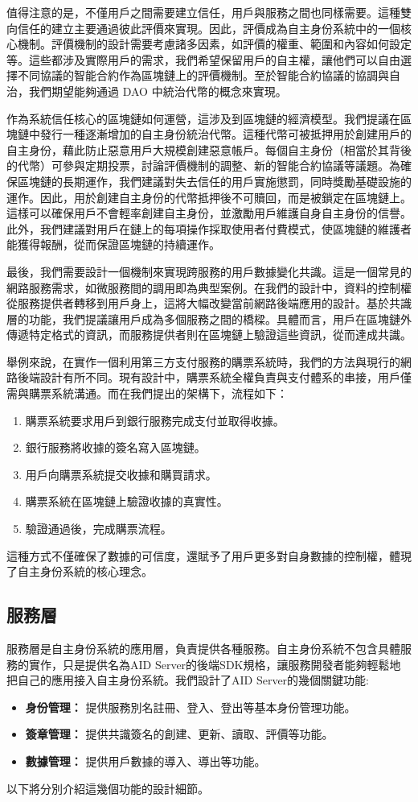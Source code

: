 值得注意的是，不僅用戶之間需要建立信任，用戶與服務之間也同樣需要。這種雙向信任的建立主要通過彼此評價來實現。因此，評價成為自主身份系統中的一個核心機制。評價機制的設計需要考慮諸多因素，如評價的權重、範圍和內容如何設定等。這些都涉及實際用戶的需求，我們希望保留用戶的自主權，讓他們可以自由選擇不同協議的智能合約作為區塊鏈上的評價機制。至於智能合約協議的協調與自治，我們期望能夠通過 DAO 中統治代幣的概念來實現。

作為系統信任核心的區塊鏈如何運營，這涉及到區塊鏈的經濟模型。我們提議在區塊鏈中發行一種逐漸增加的自主身份統治代幣。這種代幣可被抵押用於創建用戶的自主身份，藉此防止惡意用戶大規模創建惡意帳戶。每個自主身份（相當於其背後的代幣）可參與定期投票，討論評價機制的調整、新的智能合約協議等議題。為確保區塊鏈的長期運作，我們建議對失去信任的用戶實施懲罰，同時獎勵基礎設施的運作。因此，用於創建自主身份的代幣抵押後不可贖回，而是被鎖定在區塊鏈上。這樣可以確保用戶不會輕率創建自主身份，並激勵用戶維護自身自主身份的信譽。此外，我們建議對用戶在鏈上的每項操作採取使用者付費模式，使區塊鏈的維護者能獲得報酬，從而保證區塊鏈的持續運作。

最後，我們需要設計一個機制來實現跨服務的用戶數據變化共識。這是一個常見的網路服務需求，如微服務間的調用即為典型案例。在我們的設計中，資料的控制權從服務提供者轉移到用戶身上，這將大幅改變當前網路後端應用的設計。基於共識層的功能，我們提議讓用戶成為多個服務之間的橋樑。具體而言，用戶在區塊鏈外傳遞特定格式的資訊，而服務提供者則在區塊鏈上驗證這些資訊，從而達成共識。

舉例來說，在實作一個利用第三方支付服務的購票系統時，我們的方法與現行的網路後端設計有所不同。現有設計中，購票系統全權負責與支付體系的串接，用戶僅需與購票系統溝通。而在我們提出的架構下，流程如下：
\begin{enumerate}
  \item 購票系統要求用戶到銀行服務完成支付並取得收據。
  \item 銀行服務將收據的簽名寫入區塊鏈。
  \item 用戶向購票系統提交收據和購買請求。
  \item 購票系統在區塊鏈上驗證收據的真實性。
  \item 驗證通過後，完成購票流程。
\end{enumerate}
這種方式不僅確保了數據的可信度，還賦予了用戶更多對自身數據的控制權，體現了自主身份系統的核心理念。
\subsection{服務層}
服務層是自主身份系統的應用層，負責提供各種服務。自主身份系統不包含具體服務的實作，只是提供名為AID Server的後端SDK規格，讓服務開發者能夠輕鬆地把自己的應用接入自主身份系統。我們設計了AID Server的幾個關鍵功能:
\begin{itemize}
  \item \textbf{身份管理：} 提供服務別名註冊、登入、登出等基本身份管理功能。
  \item \textbf{簽章管理：} 提供共識簽名的創建、更新、讀取、評價等功能。
  \item \textbf{數據管理：} 提供用戶數據的導入、導出等功能。
\end{itemize}
以下將分別介紹這幾個功能的設計細節。
